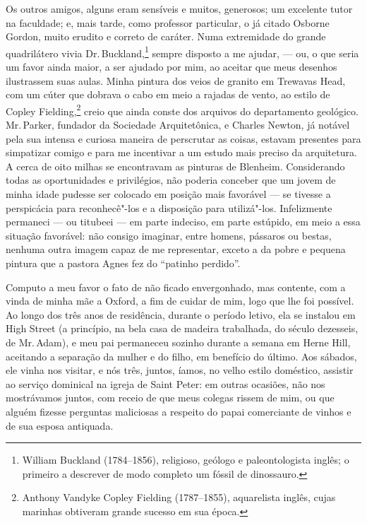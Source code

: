 Os outros amigos, alguns eram sensíveis e muitos, generosos; um
excelente tutor na faculdade; e, mais tarde, como professor particular,
o já citado Osborne Gordon, muito erudito e correto de caráter. Numa
extremidade do grande quadrilátero vivia Dr.\,Buckland,\footnote{William
  Buckland (1784--1856), religioso, geólogo e paleontologista inglês; o
  primeiro a descrever de modo completo um fóssil de dinossauro.} sempre disposto a me ajudar, --- ou, o que seria um favor
ainda maior, a ser ajudado por mim, ao aceitar que meus desenhos
ilustrassem suas aulas. Minha pintura dos veios de granito em Trewavas
Head, com um cúter que dobrava o cabo em meio a rajadas de vento, ao
estilo de Copley Fielding,\footnote{Anthony Vandyke Copley Fielding
  (1787--1855), aquarelista inglês, cujas marinhas obtiveram grande
  sucesso em sua época.} creio que ainda conste dos
arquivos do departamento geológico. Mr.\,Parker, fundador da Sociedade
Arquitetônica, e Charles Newton, já notável pela sua intensa e curiosa
maneira de perscrutar as coisas, estavam presentes para simpatizar
comigo e para me incentivar a um estudo mais preciso da arquitetura. A
cerca de oito milhas se encontravam as pinturas de Blenheim.
Considerando todas as oportunidades e privilégios, não poderia conceber
que um jovem de minha idade pudesse ser colocado em posição mais
favorável --- se tivesse a perspicácia para reconhecê"-los e a disposição
para utilizá"-los. Infelizmente permaneci --- ou titubeei --- em parte
indeciso, em parte estúpido, em meio a essa situação favorável: não
consigo imaginar, entre homens, pássaros ou bestas, nenhuma outra imagem
capaz de me representar, exceto a da pobre e pequena pintura que a
pastora Agnes fez do ``patinho perdido''.

Computo a meu favor o fato de não ficado envergonhado, mas
contente, com a vinda de minha mãe a Oxford, a fim de cuidar de mim,
logo que lhe foi possível. Ao longo dos três anos de residência, durante
o período letivo, ela se instalou em High Street (a princípio, na bela
casa de madeira trabalhada, do século dezesseis, de Mr.\,Adam), e meu pai
permaneceu sozinho durante a semana em Herne Hill, aceitando a separação
da mulher e do filho, em benefício do último. Aos sábados, ele vinha nos
visitar, e nós três, juntos, íamos, no velho estilo doméstico, assistir
ao serviço dominical na igreja de Saint Peter: em outras ocasiões, não
nos mostrávamos juntos, com receio de que meus colegas rissem de mim, ou
que alguém fizesse perguntas maliciosas a respeito do papai comerciante
de vinhos e de sua esposa antiquada.

